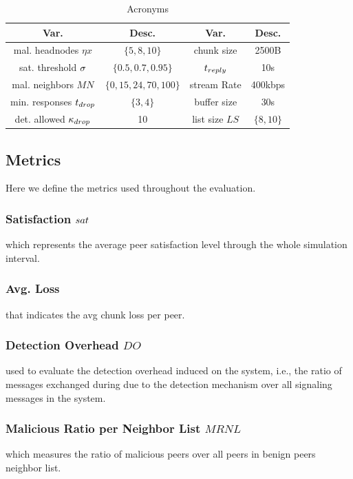 \begin{table}[ht]
\center
\caption{Acronyms}
\begin{tabular}{|c|c||c|c|}
\hline

\bf{Var.} & \bf{Desc.}  & \bf{Var.} & \bf{Desc.} \\\hline\hline

mal. headnodes $\eta x$ & $\{5,8,10\}$ & chunk size & 2500B \\\hline
sat. threshold $\sigma$ & $\{0.5,0.7,0.95\}$ & $t_{reply}$ & 10s\\\hline
mal. neighbors $MN$  & $\{0,15,24,70,100\}$ & stream Rate & 400kbps\\\hline
min. responses $t_{drop}$ &  $\{3,4\}$ & buffer size & 30s  \\\hline
det. allowed $\kappa_{drop}$ & 10 & list size $LS$ & $\{8,10\}$\\\hline
  
\end{tabular}
\label{tab:parameters}
\end{table}

\subsection{Metrics}

Here we define the metrics used throughout the evaluation.
\subsubsection*{Satisfaction $sat$} which represents the average peer satisfaction level through the whole simulation interval.
\subsubsection*{Avg. Loss} that indicates the avg chunk loss per peer.
\subsubsection*{Detection Overhead $DO$} used to evaluate the detection overhead induced on the system, i.e., the ratio of messages exchanged during due to the detection mechanism over all signaling messages in the system.
\subsubsection*{Malicious Ratio per Neighbor List $MRNL$} which measures the ratio of malicious peers over all peers in benign peers neighbor list.

